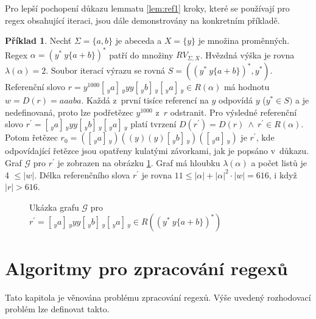 \documentclass[thesis=B,czech]{FITthesis}[2019/12/23]
\theoremstyle{definition}
\newtheorem{example}{Příklad}[chapter]
\begin{document}
Pro lepší pochopení důkazu lemmatu \ref{lem:ref1} kroky, které se používají pro regex obsahující iteraci, jsou dále demonstrovány na konkretním příkladě.
 
\begin{example}
Nechť $\Sigma = \{a, b\}$ je abeceda a $X=\{y\}$ je množina proměnných. Regex $\alpha = (y^\ast \ y \{a+b\})^\ast$ patří do množiny $RV_{\Sigma, X}$. Hvězdná výška je rovna $\lambda(\alpha) = 2$. Soubor iterací výrazu se rovná $S = \left((y^\ast \ y \{a+b\})^\ast, y^\ast\right)$. Referenční slovo $r = y^{1000} [\,_y a ]\,_y y y [\,_y b ]\,_y [\,_y a ]\,_y \in R(\alpha)$ má hodnotu $w=D(r)=aaaba$. Každá z~první tisíce referencí na $y$ odpovídá $y$ ($y^\ast \in S)$ a je nedefinovaná, proto lze podřetězec $y^{1000}$ z~$r$ odstranit. Pro výsledné referenční slovo $r^\prime = [\,_y a ]\,_y y y [\,_y b ]\,_y [\,_y a ]\,_y$ platí tvrzení $D(r^\prime)=D(r) \ \wedge \ r^\prime \in R(\alpha)$. Potom řetězec $r_0 = ([\,_y a ]\,_y) ((y) (y) [\,_y b ]\,_y) ([\,_y a ]\,_y)$ je $r^\prime$, kde odpovídající řetězce jsou opatřeny kulatými závorkami, jak je popsáno v~důkazu. Graf $\mathcal{G}$ pro $r^\prime$ je zobrazen na obrázku \ref{fig:refproof}. Graf má hloubku $\lambda(\alpha)$ a počet listů je 4 $\le |w|$. Délka referenčního slova $r^\prime$ je rovna $11 \le |\alpha| + |\alpha|^2\cdot|w|=616$, i když $|r| > 616$. 
\end{example}

\begin{figure}[h]
\centering

\caption{Ukázka grafu $\mathcal{G}$ pro $r^\prime=[\,_y a ]\,_y y y [\,_y b ]\,_y [\,_y a ]\,_y \in R((y^\ast \ y\{a+b\})^\ast)$}\label{fig:refproof}
\end{figure}

\chapter{Algoritmy pro zpracování regexů}
Tato kapitola je věnována problému zpracování regexů. Výše uvedený rozhodovací problém lze definovat takto.
\end{document}
